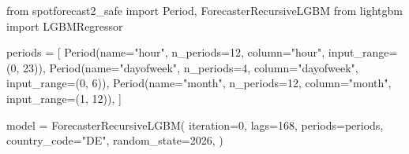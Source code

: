 \documentclass[
  english,
  letterpaper,
]{scrbook}
\newenvironment{Shaded}{\begin{snugshade}}{\end{snugshade}}
\newcommand{\DecValTok}[1]{\textcolor[rgb]{0.68,0.00,0.00}{#1}}
\newcommand{\ImportTok}[1]{\textcolor[rgb]{0.00,0.46,0.62}{#1}}
\newcommand{\NormalTok}[1]{\textcolor[rgb]{0.00,0.23,0.31}{#1}}
\newcommand{\OperatorTok}[1]{\textcolor[rgb]{0.37,0.37,0.37}{#1}}
\newcommand{\StringTok}[1]{\textcolor[rgb]{0.13,0.47,0.30}{#1}}
\begin{document}
\protect{}\label{instantiate-model}
\begin{Shaded}
\begin{Highlighting}[]
\ImportTok{from}\NormalTok{ spotforecast2\_safe }\ImportTok{import}\NormalTok{ Period, ForecasterRecursiveLGBM}
\ImportTok{from}\NormalTok{ lightgbm }\ImportTok{import}\NormalTok{ LGBMRegressor}

\NormalTok{periods }\OperatorTok{=}\NormalTok{ [}
\NormalTok{    Period(name}\OperatorTok{=}\StringTok{"hour"}\NormalTok{,      n\_periods}\OperatorTok{=}\DecValTok{12}\NormalTok{, column}\OperatorTok{=}\StringTok{"hour"}\NormalTok{,      input\_range}\OperatorTok{=}\NormalTok{(}\DecValTok{0}\NormalTok{, }\DecValTok{23}\NormalTok{)),}
\NormalTok{    Period(name}\OperatorTok{=}\StringTok{"dayofweek"}\NormalTok{, n\_periods}\OperatorTok{=}\DecValTok{4}\NormalTok{,  column}\OperatorTok{=}\StringTok{"dayofweek"}\NormalTok{, input\_range}\OperatorTok{=}\NormalTok{(}\DecValTok{0}\NormalTok{,  }\DecValTok{6}\NormalTok{)),}
\NormalTok{    Period(name}\OperatorTok{=}\StringTok{"month"}\NormalTok{,     n\_periods}\OperatorTok{=}\DecValTok{12}\NormalTok{, column}\OperatorTok{=}\StringTok{"month"}\NormalTok{,     input\_range}\OperatorTok{=}\NormalTok{(}\DecValTok{1}\NormalTok{, }\DecValTok{12}\NormalTok{)),}
\NormalTok{]}

\NormalTok{model }\OperatorTok{=}\NormalTok{ ForecasterRecursiveLGBM(}
\NormalTok{    iteration}\OperatorTok{=}\DecValTok{0}\NormalTok{,}
\NormalTok{    lags}\OperatorTok{=}\DecValTok{168}\NormalTok{,}
\NormalTok{    periods}\OperatorTok{=}\NormalTok{periods,}
\NormalTok{    country\_code}\OperatorTok{=}\StringTok{"DE"}\NormalTok{,}
\NormalTok{    random\_state}\OperatorTok{=}\DecValTok{2026}\NormalTok{,}
\NormalTok{)}


\end{Highlighting}
\end{Shaded}
\end{document}

